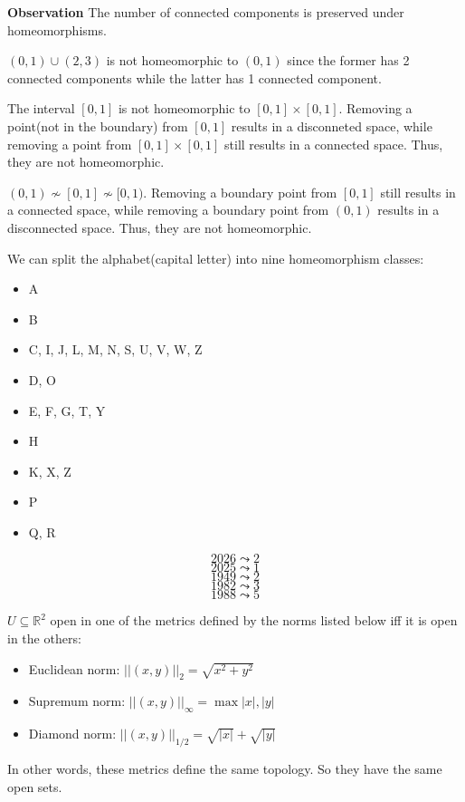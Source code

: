 \documentclass[main.tex]{subfiles}
\begin{document}
\par \noindent \textbf{Observation} The number of connected components is preserved under homeomorphisms. 
\begin{example}
    $(0, 1) \cup (2,3)$ is not homeomorphic to $(0,1)$ since the former has 2 connected components while the latter has 1 connected component. 
\end{example}

\begin{example}
    The interval $[0, 1]$ is not homeomorphic to $[0, 1]\times [0, 1]$. Removing a point(not in the boundary) from $[0, 1]$ results in a disconneted space, while removing a point from $[0, 1]\times [0, 1]$ still results in a connected space. Thus, they are not homeomorphic. 
\end{example}

\begin{example}
    $(0, 1) \nsim [0, 1] \nsim [0, 1)$. Removing a boundary point from $[0, 1]$ still results in a connected space, while removing a boundary point from $(0, 1)$ results in a disconnected space. Thus, they are not homeomorphic.
\end{example}

\begin{example}
    We can split the alphabet(capital letter) into nine homeomorphism classes:
    \begin{itemize}
        \item A   
        \item B 
        \item C, I, J, L, M, N, S, U, V, W, Z
        \item D, O 
        \item E, F, G, T, Y 
        \item H 
        \item K, X, Z 
        \item P 
        \item Q, R 
    \end{itemize}
\end{example}

\begin{example}
    $$2026 \leadsto 2$$
    $$2025 \leadsto 1$$
    $$1949 \leadsto 2$$
    $$1982 \leadsto 3$$
    $$1988 \leadsto 5$$
\end{example}

\begin{property}
    $U \subseteq \mathbb{R}^2$ open in one of the metrics defined by the norms listed below iff it is open in the others:
    \begin{itemize}
        \item Euclidean norm: $||(x,y)||_2 = \sqrt{x^2 + y^2}$
        \item Supremum norm: $||(x,y)||_\infty = \max{|x|, |y|}$
        \item Diamond norm: $||(x,y)||_{1/2} = \sqrt{|x|} + \sqrt{|y|}$
    \end{itemize}
    In other words, these metrics define the same topology. So they have the same open sets. 
\end{property}
\end{document}
